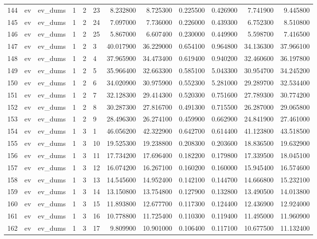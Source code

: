\begin{tabular}{llllllrrrrrr}
144 & ev & ev_dums & 1 & 2 & 23 & 8.232800 & 8.725300 & 0.225500 & 0.426900 & 7.741900 & 9.445800 \\
145 & ev & ev_dums & 1 & 2 & 24 & 7.097000 & 7.736000 & 0.226000 & 0.439300 & 6.752300 & 8.510800 \\
146 & ev & ev_dums & 1 & 2 & 25 & 5.867000 & 6.607400 & 0.230000 & 0.449900 & 5.598700 & 7.416500 \\
147 & ev & ev_dums & 1 & 2 & 3 & 40.017900 & 36.229000 & 0.654100 & 0.964800 & 34.136300 & 37.966100 \\
148 & ev & ev_dums & 1 & 2 & 4 & 37.965900 & 34.473400 & 0.619400 & 0.940200 & 32.460600 & 36.197800 \\
149 & ev & ev_dums & 1 & 2 & 5 & 35.966400 & 32.663300 & 0.585100 & 5.043300 & 30.954700 & 34.245200 \\
150 & ev & ev_dums & 1 & 2 & 6 & 34.020900 & 30.975900 & 0.552300 & 5.281000 & 29.289700 & 32.534400 \\
151 & ev & ev_dums & 1 & 2 & 7 & 32.128300 & 29.414300 & 0.520300 & 0.751600 & 27.789300 & 30.774200 \\
152 & ev & ev_dums & 1 & 2 & 8 & 30.287300 & 27.816700 & 0.491300 & 0.715500 & 26.287000 & 29.065800 \\
153 & ev & ev_dums & 1 & 2 & 9 & 28.496300 & 26.274100 & 0.459900 & 0.662900 & 24.841900 & 27.461000 \\
154 & ev & ev_dums & 1 & 3 & 1 & 46.056200 & 42.322900 & 0.642700 & 0.614400 & 41.123800 & 43.518500 \\
155 & ev & ev_dums & 1 & 3 & 10 & 19.525300 & 19.238800 & 0.208300 & 0.203600 & 18.836500 & 19.632900 \\
156 & ev & ev_dums & 1 & 3 & 11 & 17.734200 & 17.696400 & 0.182200 & 0.179800 & 17.339500 & 18.045100 \\
157 & ev & ev_dums & 1 & 3 & 12 & 16.074200 & 16.267100 & 0.160200 & 0.160000 & 15.945400 & 16.574600 \\
158 & ev & ev_dums & 1 & 3 & 13 & 14.545600 & 14.952400 & 0.142100 & 0.144700 & 14.666800 & 15.232100 \\
159 & ev & ev_dums & 1 & 3 & 14 & 13.150800 & 13.754800 & 0.127900 & 0.132800 & 13.490500 & 14.013800 \\
160 & ev & ev_dums & 1 & 3 & 15 & 11.893800 & 12.677700 & 0.117300 & 0.124400 & 12.436900 & 12.924000 \\
161 & ev & ev_dums & 1 & 3 & 16 & 10.778800 & 11.725400 & 0.110300 & 0.119400 & 11.495000 & 11.960900 \\
162 & ev & ev_dums & 1 & 3 & 17 & 9.809900 & 10.901000 & 0.106400 & 0.117100 & 10.677500 & 11.132400 \\

\end{tabular}
